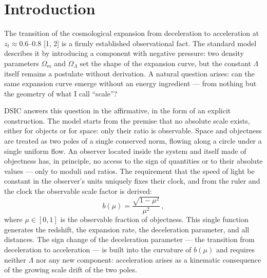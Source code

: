 \documentclass{article}
\begin{document}
\begin{abstract}
The early Universe is delegated to the \textbf{second tier} of the model (Part II): the form of the correction to the light path is derived from an additional postulate on the binding of objects, and the single threshold $\mu_d \approx 0.9806$ ($z \approx 4.5$) is calibrated against a single observation --- the distance to the last-scattering surface; the status of this superstructure --- a calibration with the form fixed by the postulate, not a prediction --- is stated explicitly. Structure growth is not derived from the core; the model's background has been checked for compatibility with the standard (GR-limit) growth of linear perturbations: on the $f\sigma_8$ compilation (``Gold-2017'' [13, 14]) one recovers $S_8 \approx 0.76$, statistically indistinguishable from $\Lambda$CDM (\S12); deriving growth from binding remains a direction for development. All empirical claims are reproducible with scripts from the open repository.
\end{abstract}
\section{Introduction}

The transition of the cosmological expansion from deceleration to acceleration at $z_t \approx 0.6\text{--}0.8$ [1, 2] is a firmly established observational fact. The standard model describes it by introducing a component with negative pressure: two density parameters $\Omega_m$ and $\Omega_\Lambda$ set the shape of the expansion curve, but the constant $\Lambda$ itself remains a postulate without derivation. A natural question arises: can the same expansion curve emerge without an energy ingredient --- from nothing but the geometry of what I call ``scale''?

DSIC answers this question in the affirmative, in the form of an explicit construction. The model starts from the premise that no absolute scale exists, either for objects or for space: only their ratio is observable. Space and objectness are treated as two poles of a single conserved norm, flowing along a circle under a single uniform flow. An observer located inside the system and itself made of objectness has, in principle, no access to the sign of quantities or to their absolute values --- only to moduli and ratios. The requirement that the speed of light be constant in the observer's units uniquely fixes their clock, and from the ruler and the clock the observable scale factor is derived:
\begin{equation}
b(\mu) = \frac{\sqrt{1 - \mu^2}}{\mu^2}\,,
\end{equation}
where $\mu \in [0, 1]$ is the observable fraction of objectness. This single function generates the redshift, the expansion rate, the deceleration parameter, and all distances. The sign change of the deceleration parameter --- the transition from deceleration to acceleration --- is built into the curvature of $b(\mu)$ and requires neither $\Lambda$ nor any new component: acceleration arises as a kinematic consequence of the growing scale drift of the two poles.
\end{document}
